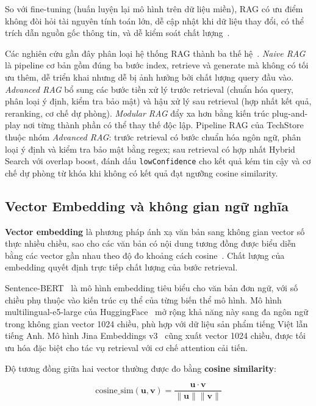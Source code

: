 So với fine-tuning (huấn luyện lại mô hình trên dữ liệu miền), RAG có ưu điểm không đòi hỏi tài nguyên tính toán lớn, dễ cập nhật khi dữ liệu thay đổi, có thể trích dẫn nguồn gốc thông tin, và dễ kiểm soát chất lượng~\cite{gao2023retrieval}.

Các nghiên cứu gần đây phân loại hệ thống RAG thành ba thế hệ~\cite{gao2023retrieval}. \textit{Naive RAG} là pipeline cơ bản gồm đúng ba bước index, retrieve và generate mà không có tối ưu thêm, dễ triển khai nhưng dễ bị ảnh hưởng bởi chất lượng query đầu vào. \textit{Advanced RAG} bổ sung các bước tiền xử lý trước retrieval (chuẩn hóa query, phân loại ý định, kiểm tra bảo mật) và hậu xử lý sau retrieval (hợp nhất kết quả, reranking, cơ chế dự phòng). \textit{Modular RAG} đẩy xa hơn bằng kiến trúc plug-and-play nơi từng thành phần có thể thay thế độc lập. Pipeline RAG của TechStore thuộc nhóm \textit{Advanced RAG}: trước retrieval có bước chuẩn hóa ngôn ngữ, phân loại ý định và kiểm tra bảo mật bằng regex; sau retrieval có hợp nhất Hybrid Search với overlap boost, đánh dấu \texttt{lowConfidence} cho kết quả kém tin cậy và cơ chế dự phòng từ khóa khi không có kết quả đạt ngưỡng cosine similarity.

\subsection{Vector Embedding và không gian ngữ nghĩa}

\textbf{Vector embedding} là phương pháp ánh xạ văn bản sang không gian vector số thực nhiều chiều, sao cho các văn bản có nội dung tương đồng được biểu diễn bằng các vector gần nhau theo độ đo khoảng cách cosine~\cite{mikolov2013word2vec}. Chất lượng của embedding quyết định trực tiếp chất lượng của bước retrieval.

Sentence-BERT~\cite{reimers2019sentencebert} là mô hình embedding tiêu biểu cho văn bản đơn ngữ, với số chiều phụ thuộc vào kiến trúc cụ thể của từng biến thể mô hình. Mô hình multilingual-e5-large của HuggingFace~\cite{wang2022text} mở rộng khả năng này sang đa ngôn ngữ trong không gian vector 1024 chiều, phù hợp với dữ liệu sản phẩm tiếng Việt lẫn tiếng Anh. Mô hình Jina Embeddings v3~\cite{sturua2024jina} cũng xuất vector 1024 chiều, được tối ưu hóa đặc biệt cho tác vụ retrieval với cơ chế attention cải tiến.

Độ tương đồng giữa hai vector thường được đo bằng \textbf{cosine similarity}:

\begin{equation}
\text{cosine\_sim}(\mathbf{u}, \mathbf{v}) = \frac{\mathbf{u} \cdot \mathbf{v}}{\|\mathbf{u}\| \|\mathbf{v}\|}
\label{eq:cosine_similarity}
\end{equation}


